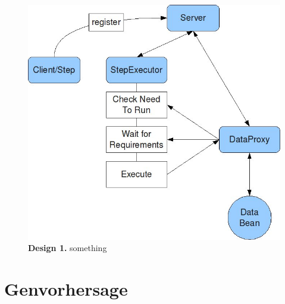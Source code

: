 \begin{figure}[htbp]
	\begin{center}
		\includegraphics[scale=0.6]{pics/programOrganisationOverview3ScaledWithAlpha.jpg}
	\caption[Design 1]{
	\textbf{Design 1.}
	something}
	\end{center}
	\label{fig:programOrganisationOverview3ScaledWithAlpha}
\end{figure}

\section{Genvorhersage}






 
